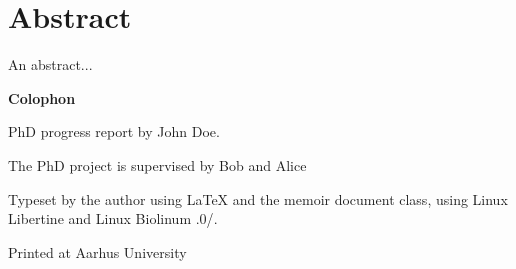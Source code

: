 
\setcounter{page}{2}

\vspace*{0.5cm}
\section*{Abstract}
\thispagestyle{empty}

An abstract...



\makeatletter
\edef\fontandleading{\@memptsize.0/\the\baselineskip}
\makeatother

\strut\vfill
{
  \setlength{\parindent}{0pt}
  \addtolength{\parskip}{.6em}

  \begin{center}
    \bfseries\sffamily Colophon
  \end{center}

  \small

  \textsl{\projecttitle}

  \smallskip

  PhD progress report by John Doe.

  The PhD project is supervised by Bob and Alice

  Typeset by the author using \LaTeX{} and the \textsf{memoir} document class,
  using Linux Libertine and Linux Biolinum {\fontandleading}.

  Printed at Aarhus University
}